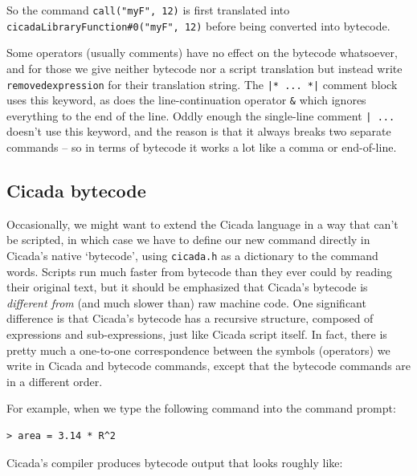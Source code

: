 \documentclass{article}
\newenvironment{code}{
       \begin{list}{}{
               \setlength{\leftmargin}{.4in}
               \setlength{\rightmargin}{0in}
               \setlength{\topsep}{.2in}
       }
       \small
       \item[] }
       { \end{list}   }
\begin{document}
\noindent So the command \verb#call("myF", 12)# is first translated into \verb$cicadaLibraryFunction#0("myF", 12)$ before being converted into bytecode.

Some operators (usually comments) have no effect on the bytecode whatsoever, and for those we give neither bytecode nor a script translation but instead write \verb#removedexpression# for their translation string.  The \verb#|* ... *|# comment block uses this keyword, as does the line-continuation operator \verb#&# which ignores everything to the end of the line.  Oddly enough the single-line comment \verb#| ...# doesn't use this keyword, and the reason is that it always breaks two separate commands -- so in terms of bytecode it works a lot like a comma or end-of-line. 






\subsection{Cicada bytecode}

Occasionally, we might want to extend the Cicada language in a way that can't be scripted, in which case we have to define our new command directly in Cicada's native `bytecode', using \verb#cicada.h# as a dictionary to the command words.  Scripts run much faster from bytecode than they ever could by reading their original text, but it should be emphasized that Cicada's bytecode is \emph{different from} (and much slower than) raw machine code.  One significant difference is that Cicada's bytecode has a recursive structure, composed of expressions and sub-expressions, just like Cicada script itself.  In fact, there is pretty much a one-to-one correspondence between the symbols (operators) we write in Cicada and bytecode commands, except that the bytecode commands are in a different order.

For example, when we type the following command into the command prompt:

\begin{code} \begin{verbatim}
> area = 3.14 * R^2
\end{verbatim} \end{code}

\noindent Cicada's compiler produces bytecode output that looks roughly like:
\end{document}
